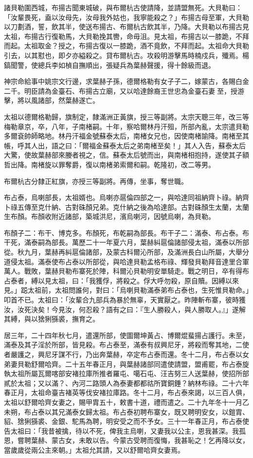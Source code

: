 \begin{pinyinscope}
諸貝勒圍西城，布揚古聞東城破，與布爾杭古使請降，並請盟無死。大貝勒曰：「汝輩畏死，盍以汝母先，汝母我外姑也，我寧能殺之？」布揚古母至軍，大貝勒以刀劃酒，誓，飲其半，使送布揚古、布爾杭古飲其半，乃降。大貝勒以布揚古見太祖，布揚古行復勒馬，大貝勒挽其轡，命毋沮。見太祖，布揚古以一膝跪，不拜而起。太祖取金？授之，布揚古復以一膝跪，酒不竟飲，不拜而起。太祖命大貝勒引去，以其懟也，即夕亦縊殺之。貸布爾杭古。攻殺明游擊馬時楠戍兵，殲焉。楊鎬聞警，使總兵李如楨自撫順出，張疑兵為葉赫聲援，得十餘級而退。

神宗命給事中姚宗文行邊，求葉赫子孫，德爾格勒有女子子二，嫁蒙古，各賜白金二千。明臣請為金臺石、布揚古立廟，又以哈達餘裔王世忠為金臺石妻至，授游擊，將以風諸部，然葉赫遂亡。

太祖以德爾格勒歸，旗制定，隸滿洲正黃旗，授三等副將。太宗天聰三年，改三等梅勒章京，卒，八年，子南楮嗣。十年，察哈爾林丹汗殂，所部內亂，太宗遣貝勒多爾袞帥師略地。林丹汗福金號蘇泰太后，南楮女兄也，因使南楮諭降。南楮至其帳，呼其人出，語之曰：「爾福金蘇泰太后之弟南楮至矣！」其人入告，蘇泰太后大驚，使故葉赫部來媵者視之，信。蘇泰太后號而出，與南楮相抱持，遂使其子額哲出降。南楮旋以罪奪爵，復以南楮弟索爾和嗣。乾隆初，改二等男。

布爾杭古分隸正紅旗，亦授三等副將。再傳，坐事，奪世職。

布占泰，烏喇部長，太祖婿也。烏喇亦扈倫四部之一，與哈達同祖納齊卜祿。納齊卜祿五傳至克什納、古對硃顏兄弟。克什納之後為哈達部。古對硃顏生太蘭，太蘭生布顏。布顏收附近諸部，築城洪尼，濱烏喇河，因號烏喇，為貝勒。

布顏子二：布干、博克多。布顏死，布乾嗣為部長。布干子二：滿泰、布占泰。布干死，滿泰嗣為部長。萬歷二十一年夏六月，葉赫糾扈倫諸部侵太祖，滿泰以所部從。秋九月，葉赫再糾扈倫諸部，及蒙古科爾沁所部，及滿洲長白山所屬，大舉分道侵太祖。滿泰使布占泰以所部從，與哈達貝勒孟格布祿、輝發貝勒拜音達里合軍萬人。戰敗，葉赫貝勒布寨死於陣，科爾沁貝勒明安單騎走。戰之明日，卒有得布占泰者，縛以見太祖，曰：「我獲俘，將殺之。俘大呼勿殺，原自贖。因縛以來見。」跽太祖前，太祖問誰何，對曰：「烏喇貝勒滿泰弟布占泰也，生死惟貝勒命。」叩首不已。太祖曰：「汝輩合九部兵為暴於無辜，天實厭之。昨陣斬布寨，彼時獲汝，汝死決矣！今見汝，何忍殺？語有之曰：『生人勝殺人，與人勝取人。』」遂解其縛，與以猞猁猻裘，撫育之。

居三年，二十四年秋七月，遣還所部，使圖爾坤黃占、博爾焜蜚揚占護行。未至，滿泰及其子淫於所部，皆見殺。布占泰至，滿泰有叔興尼牙，將殺而奪其地，二使者嚴護之，興尼牙謀不行，乃出奔葉赫，卒定布占泰而還。冬十二月，布占泰以女弟妻貝勒舒爾哈齊。二十五年春正月，與葉赫諸部同遣使請盟，盟甫罷，布占泰旋執太祖所屬瓦爾喀部安褚拉庫所推者羅屯、噶石屯、汪吉努三人送葉赫，使招所部貳於太祖；又以滿？、內河二路頭人為泰妻都都祜所寶銅錘？納林布祿。二十六年春正月，太祖命臺吉褚英等伐安褚拉庫路。冬十二月，布占泰來謁，以三百人俱，太祖以舒爾哈齊女妻之，賜甲胄五十，敕書十道，禮而遣之。二十九年冬十一月乙未朔，布占泰以其兄滿泰女歸太祖。布占泰初聘布寨女，既又聘明安女，以鎧胄、貂、猞猁猻裘、金銀、駝馬為聘，明安受之而不予女。三十一年春正月，布占泰使告太祖曰：「我昔被擒，待以不死，俾我主烏喇，又妻我以公主，恩我甚深。我孤恩，嘗聘葉赫、蒙古女，未敢以告。今蒙古受聘而復悔，我甚恥之！乞再降以女，當歲歲從兩公主來朝。」太祖允其請，又以舒爾哈齊女妻焉。


\end{pinyinscope}
